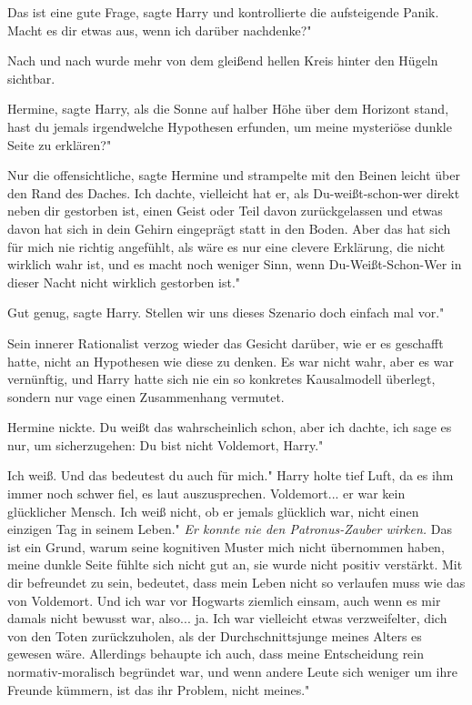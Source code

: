 \glqq Das ist eine gute Frage\grqq{}, sagte Harry und kontrollierte die
aufsteigende Panik. \glqq Macht es dir etwas aus, wenn ich darüber nachdenke?"

Nach und nach wurde mehr von dem gleißend hellen Kreis hinter den Hügeln
sichtbar.

\glqq Hermine\grqq{}, sagte Harry, als die Sonne auf halber Höhe über dem
Horizont stand, \glqq hast du jemals irgendwelche Hypothesen erfunden, um meine
mysteriöse dunkle Seite zu erklären?"

\glqq Nur die offensichtliche\grqq{}, sagte Hermine und strampelte mit den
Beinen leicht über den Rand des Daches. \glqq Ich dachte, vielleicht hat er, als
Du-weißt-schon-wer direkt neben dir gestorben ist, einen Geist oder Teil davon
zurückgelassen und etwas davon hat sich in dein Gehirn eingeprägt statt in den
Boden. Aber das hat sich für mich nie richtig angefühlt, als wäre es nur eine
clevere Erklärung, die nicht wirklich wahr ist, und es macht noch weniger Sinn,
wenn Du-Weißt-Schon-Wer in dieser Nacht nicht wirklich gestorben ist."

\glqq Gut genug\grqq{}, sagte Harry. \glqq Stellen wir uns dieses Szenario doch
einfach mal vor."

Sein innerer Rationalist verzog wieder das Gesicht darüber, wie er es geschafft
hatte, nicht an Hypothesen wie diese zu denken. Es war nicht wahr, aber es war
vernünftig, und Harry hatte sich nie ein so konkretes Kausalmodell überlegt,
sondern nur vage einen Zusammenhang vermutet.

Hermine nickte. \glqq Du weißt das wahrscheinlich schon, aber ich dachte, ich
sage es nur, um sicherzugehen: Du bist nicht Voldemort, Harry."

\glqq Ich weiß. Und das bedeutest du auch für mich." Harry holte tief Luft, da
es ihm immer noch schwer fiel, es laut auszusprechen. \glqq Voldemort... er war
kein glücklicher Mensch. Ich weiß nicht, ob er jemals glücklich war, nicht einen
einzigen Tag in seinem Leben."
\emph{Er konnte nie den Patronus-Zauber wirken.}
\glqq Das ist ein Grund, warum seine kognitiven Muster mich nicht übernommen
haben, meine dunkle Seite fühlte sich nicht gut an, sie wurde nicht positiv
verstärkt. Mit dir befreundet zu sein, bedeutet, dass mein Leben nicht so
verlaufen muss wie das von Voldemort. Und ich war vor Hogwarts ziemlich einsam,
auch wenn es mir damals nicht bewusst war, also... ja. Ich war vielleicht etwas
verzweifelter, dich von den Toten zurückzuholen, als der Durchschnittsjunge
meines Alters es gewesen wäre. Allerdings behaupte ich auch, dass meine
Entscheidung rein normativ-moralisch begründet war, und wenn andere Leute sich
weniger um ihre Freunde kümmern, ist das ihr Problem, nicht meines."

